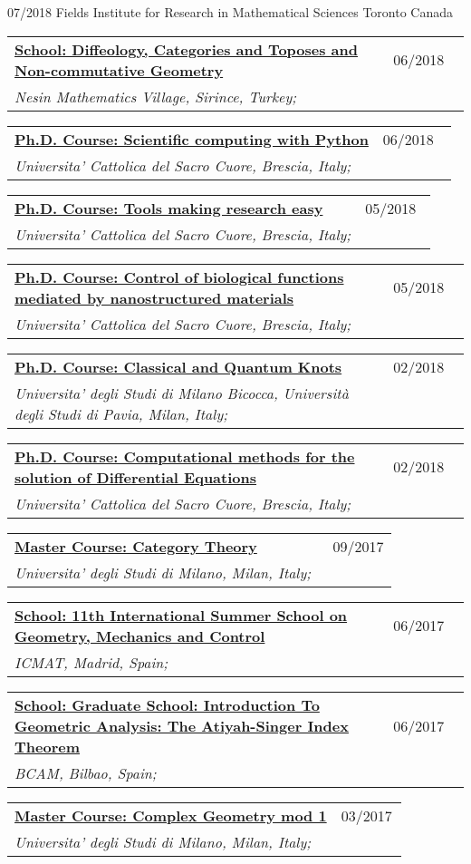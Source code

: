 \documentclass[a4paper]{article}
\newcommand{\longvoice}[8]{
	\begin{tabular}{p{0.83\linewidth} p{0.17\linewidth} }
		\textbf{\href{#3}{#2: #1}} & #4 
		\\ 
		\textit{#5, #6, #7;} & {\small\emph{#8}}
	\end{tabular}
	\vspace{.5em}
}
\begin{document}
		{07/2018}
		{Fields Institute for Research in Mathematical Sciences}
		{Toronto}
		{Canada}
		{}
	\longvoice{Diffeology, Categories and Toposes and Non-commutative Geometry}
		{School}
		{https://web.archive.org/web/20171123204026/http://www.nesinkoyleri.org/eng/events-detail.php?egitimkod=203\#icerikler}
		{06/2018}
		{Nesin Mathematics Village}
		{Sirince}
		{Turkey}
		{}
	\longvoice{Scientific computing with Python}
		{Ph.D. Course}
		{https://web.archive.org/web/20180604081514/http://dmf.unicatt.it/~della/pythoncourse18/}
		{06/2018}
		{Universita' Cattolica del Sacro Cuore}
		{Brescia}
		{Italy}
		{}
	\longvoice{Tools making research easy}
		{Ph.D. Course}
		{https://web.archive.org/web/20180604080852/http://www.dmf.unicatt.it/kropf/scientifictools18.html}
		{05/2018}
		{Universita' Cattolica del Sacro Cuore}
		{Brescia}
		{Italy}
		{}
	\longvoice{Control of biological functions mediated by nanostructured materials}
		{Ph.D. Course}
		{https://www.dropbox.com/s/8udz4zmfaxr9xb8/1805-Course-Ciofani.pdf?dl=0}
		{05/2018}
		{Universita' Cattolica del Sacro Cuore}
		{Brescia}
		{Italy}
		{}
	\longvoice{Classical and Quantum Knots}
		{Ph.D. Course}
		{https://www.dropbox.com/s/stqvkes58o410zk/1802-Course-RiccaKnots.pdf?dl=0}
		{02/2018}
		{Universita' degli Studi di Milano Bicocca, Università degli Studi di Pavia}
		{Milan}
		{Italy}
		{}
	\longvoice{Computational methods for the solution of Differential Equations}
		{Ph.D. Course}
		{https://www.dropbox.com/s/q2rapau2k49n5t7/1802-Course-NumericalPdeAvella.pdf?dl=0}
		{02/2018}
		{Universita' Cattolica del Sacro Cuore}
		{Brescia}
		{Italy}
		{}
	\longvoice{Category Theory}
		{Master Course}
		{https://web.archive.org/web/20190831103757/http://www.mat.unimi.it/users/mantovani/}
		{09/2017}
		{Universita' degli Studi di Milano}
		{Milan}
		{Italy}
		{}
	\longvoice{11th International Summer School on Geometry, Mechanics and Control}
		{School}
		{https://web.archive.org/web/20170623165825/http://gmcnet.webs.ull.es/?q=activity-detaill/1812}
		{06/2017}
		{ICMAT}
		{Madrid}
		{Spain}
		{}
	\longvoice{Graduate School: Introduction To Geometric Analysis: The Atiyah-Singer Index Theorem}
		{School}
		{https://web.archive.org/web/20170623165642/http://www.bcamath.org/es/workshops/bcam-upv-ehu-graduate-school-geometry}
		{06/2017}
		{BCAM}
		{Bilbao}
		{Spain}
		{}
	\longvoice{Complex Geometry mod 1}
		{Master Course}
		{http://www.ccdmat.unimi.it/it/corsiDiStudio/2015/F4Yof1/F4Y-A/F4Y-114/F4Y-114.15.1/programma_it.html}
		{03/2017}
		{Universita' degli Studi di Milano}
		{Milan}
		{Italy}
		{}
\end{document}

